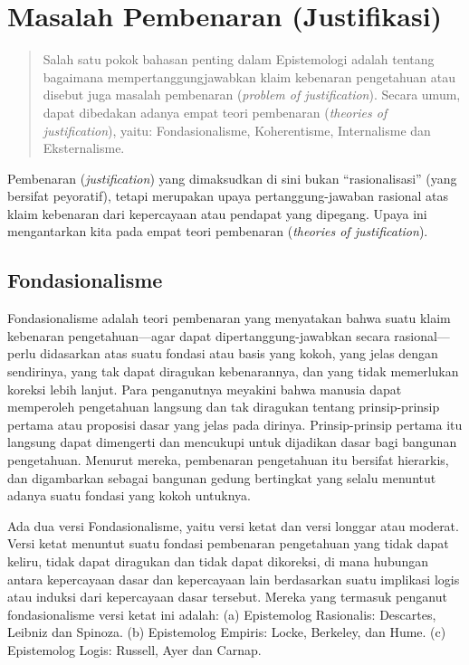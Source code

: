 \documentclass[11pt,twoside,a5paper,openany]{memoir}
\begin{document}
\hypertarget{masalah-pembenaran-justifikasi}{%
\section{Masalah Pembenaran
(Justifikasi)}\label{masalah-pembenaran-justifikasi}}

\begin{quote}
Salah satu pokok bahasan penting dalam Epistemologi adalah tentang
bagaimana mempertanggungjawabkan klaim kebenaran pengetahuan atau
disebut juga masalah pembenaran (\emph{problem of justification}).
Secara umum, dapat dibedakan adanya empat teori pembenaran
(\emph{theories of justification}), yaitu: Fondasionalisme,
Koherentisme, Internalisme dan Eksternalisme.
\end{quote}

Pembenaran (\emph{justification}) yang dimaksudkan di sini bukan
``rasionalisasi'' (yang bersifat peyoratif), tetapi merupakan upaya
pertanggung-jawaban rasional atas klaim kebenaran dari kepercayaan atau
pendapat yang dipegang. Upaya ini mengantarkan kita pada empat teori
pembenaran (\emph{theories of justification}).

\hypertarget{fondasionalisme}{%
\subsection{Fondasionalisme}\label{fondasionalisme}}

Fondasionalisme adalah teori pembenaran yang menyatakan bahwa suatu
klaim kebenaran pengetahuan---agar dapat dipertanggung-jawabkan secara
rasional---perlu didasarkan atas suatu fondasi atau basis yang kokoh,
yang jelas dengan sendirinya, yang tak dapat diragukan kebenarannya, dan
yang tidak memerlukan koreksi lebih lanjut. Para penganutnya meyakini
bahwa manusia dapat memperoleh pengetahuan langsung dan tak diragukan
tentang prinsip-prinsip pertama atau proposisi dasar yang jelas pada
dirinya. Prinsip-prinsip pertama itu langsung dapat dimengerti dan
mencukupi untuk dijadikan dasar bagi bangunan pengetahuan. Menurut
mereka, pembenaran pengetahuan itu bersifat hierarkis, dan digambarkan
sebagai bangunan gedung bertingkat yang selalu menuntut adanya suatu
fondasi yang kokoh untuknya.

Ada dua versi Fondasionalisme, yaitu versi ketat dan versi longgar atau
moderat. Versi ketat menuntut suatu fondasi pembenaran pengetahuan yang
tidak dapat keliru, tidak dapat diragukan dan tidak dapat dikoreksi, di
mana hubungan antara kepercayaan dasar dan kepercayaan lain berdasarkan
suatu implikasi logis atau induksi dari kepercayaan dasar tersebut.
Mereka yang termasuk penganut fondasionalisme versi ketat ini adalah:
(a) Epistemolog Rasionalis: Descartes, Leibniz dan Spinoza. (b)
Epistemolog Empiris: Locke, Berkeley, dan Hume. (c) Epistemolog Logis:
Russell, Ayer dan Carnap.
\end{document}
